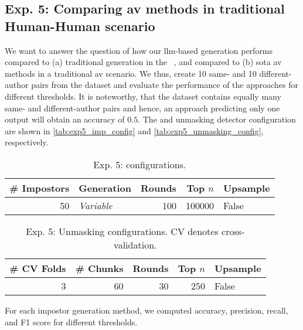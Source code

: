 \subsection{Exp. 5: Comparing \acs{av} methods in traditional Human-Human scenario}
\label{subsec:imp_gen}

We want to answer the question of how our \ac{llm}-based \imp{} generation performs compared to (a) traditional \imp{} generation in the \impAppr{}~\citep{koppel_determining_2014}, and compared to (b) \acl{sota} \ac{av} methods in a traditional \ac{av} scenario.
We thus, create 10 same- and 10 different-author pairs from the \dataStudent{} %
dataset and evaluate the performance of the approaches for different thresholds.
It is noteworthy, that the dataset contains equally many same- and different-author pairs and hence, an approach predicting only one output will obtain an accuracy of $0.5$.
The \impAppr{} and unmasking detector configuration are shown in \autoref{tab:exp5_imp_config} and \autoref{tab:exp5_unmasking_config}, respectively.

\begin{table}[h]
\centering\small
\caption{Exp. 5: \impAppr{} configurations.}
\label{tab:exp5_imp_config}
\begin{tabular}{@{}rlrrl@{}}   %
\toprule
\# Impostors & Generation & Rounds & Top $n$ & Upsample \\
\midrule
50 & \textit{Variable} & 100 & \num{100000} & False \\
\bottomrule
\end{tabular}%
\end{table}

\begin{table}[h]
\centering\small
\caption{Exp. 5: Unmasking configurations. CV denotes cross-validation.}
\label{tab:exp5_unmasking_config}
\begin{tabular}{@{}rrrrl@{}}   %
\toprule
\# CV Folds & \# Chunks & Rounds & Top $n$ & Upsample \\
\midrule
3 & 60 & 30 & \num{250} & False \\
\bottomrule
\end{tabular}%
\end{table}

For each impostor generation method, we computed accuracy, precision, recall, and F1 score for different thresholds. 
